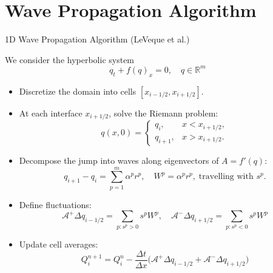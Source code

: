 \section{Wave Propagation Algorithm}


\begin{frame}{1D Wave Propagation Algorithm (LeVeque et al.)}
	\scriptsize
	
	We consider the hyperbolic system
	\[
	q_t + f(q)_x = 0, \quad q \in \mathbb{R}^m
	\]
	
	\begin{itemize}
		\item Discretize the domain into cells $[x_{i-1/2}, x_{i+1/2}]$.
		\item At each interface $x_{i+1/2}$, solve the Riemann problem:
		\[
		q(x,0) = 
		\begin{cases} 
			q_i, & x < x_{i+1/2}, \\ 
			q_{i+1}, & x > x_{i+1/2}.
		\end{cases}
		\]
		\item Decompose the jump into waves along eigenvectors of $A = f'(q)$:
		\[
		q_{i+1} - q_i = \sum_{p=1}^m \alpha^p r^p, 
		\quad W^p = \alpha^p r^p, \; \text{travelling with } s^p.
		\]
		\pause
		\item Define fluctuations:
		\[
		\mathcal{A}^+ \Delta q_{i-1/2} = \sum_{p: s^p>0} s^p W^p, \quad
		\mathcal{A}^- \Delta q_{i+1/2} = \sum_{p: s^p<0} s^p W^p
		\]
		\item Update cell averages:
		\[
		Q_i^{n+1} = Q_i^n - \frac{\Delta t}{\Delta x} 
		\Big( \mathcal{A}^+ \Delta q_{i-1/2} + \mathcal{A}^- \Delta q_{i+1/2} \Big)
		\]
	\end{itemize}
\end{frame}




